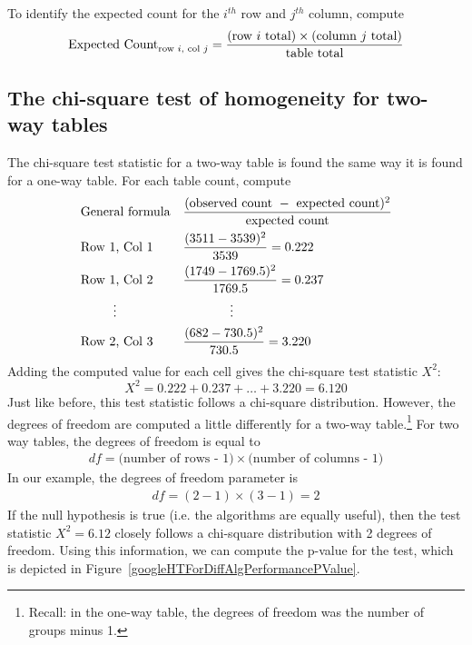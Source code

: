 \begin{termBox}{
To identify the expected count for the $i^{th}$ row and $j^{th}$ column, compute
$$\text{Expected Count}_{\text{row }i,\text{ col }j} = \frac{(\text{row $i$ total}) \times  (\text{column $j$ total})}{\text{table total}}\vspace{2mm}$$}
\end{termBox}


\subsection{The chi-square test of homogeneity for two-way tables}

The chi-square test statistic for a two-way table is found the same way it is found for a one-way table. For each table count, compute
\begin{align*}
&\text{General formula}& &\frac{(\text{observed count } - \text{ expected count})^2}{\text{expected count}} \\
&\text{Row 1, Col 1}& &\frac{(3511 - 3539)^2}{3539} = 0.222 \\
&\text{Row 1, Col 2}& &\frac{(1749 - 1769.5)^2}{1769.5} = 0.237 \\
& \hspace{9mm}\vdots & &\hspace{13mm}\vdots \\
&\text{Row 2, Col 3}& &\frac{(682 - 730.5)^2}{730.5} = 3.220
\end{align*}
Adding the computed value for each cell gives the chi-square test statistic $X^2$:
$$X^2 = 0.222 + 0.237 + \dots + 3.220 = 6.120$$
Just like before, this test statistic follows a chi-square distribution. However, the degrees of freedom are computed a little differently for a two-way table.\footnote{Recall: in the one-way table, the degrees of freedom was the number of groups minus 1.} For two way tables, the degrees of freedom is equal to
\begin{align*}
df = \text{(number of rows - 1)}\times \text{(number of columns - 1)}
\end{align*}
In our example, the degrees of freedom parameter is
\begin{align*}
df = (2-1)\times (3-1) = 2
\end{align*}
If the null hypothesis is true (i.e. the algorithms are equally useful), then the test statistic $X^2 = 6.12$ closely follows a chi-square distribution with 2 degrees of freedom. Using this information, we can compute the p-value for the test, which is depicted in Figure~\ref{googleHTForDiffAlgPerformancePValue}.

